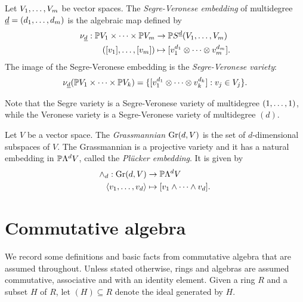 \begin{definition}
\label{introduction-definition-SegreVeronese}
Let $V_1 , \ldots , V_m$ be vector spaces. The \emph{Segre-Veronese embedding} of multidegree $\underline{d} = (d_1 , \ldots , d_m)$ is the algebraic map defined by 
\begin{align*}
\nu_{\underline{d}} : \mathbb{P} V_1 \times \cdots \times \mathbb{P} V_m &\to \mathbb{P} S^{\underline{d}}(V_1,\ldots,V_m) \\
([v_1] , \ldots , [v_m]) &\mapsto [v_1^{ d_1} \otimes \cdots \otimes v_m^{ d_m}].
\end{align*}
The image of the Segre-Veronese embedding is the \emph{Segre-Veronese variety}:
\[
\nu_{\underline{d}}( \mathbb{P} V_1 \times \cdots \times \mathbb{P} V_k ) = \{ [v_1^{ d_1} \otimes \cdots \otimes v_k^{ d_k}] :  v_j \in V_j\}.
\]
\end{definition}
Note that the Segre variety is a Segre-Veronese variety of multidegree $(1 , \ldots , 1)$, while the Veronese variety is a Segre-Veronese variety of multidegree $(d)$.

\begin{definition}[Grassmannian]
\label{introduction-definition-Grassmannian}
    Let $V$ be a vector space. The \emph{Grassmannian} $\mathrm{Gr}(d,V)$ is the set of $d$-dimensional subspaces of $V$. The Grassmannian is a projective variety and it has a natural embedding in $\mathbb{P} \Lambda^d V$, called the \emph{Pl\"ucker embedding}. It is given by
    \begin{align*}
    \wedge_{d} : \mathrm{Gr}(d,V) &\to \mathbb{P} \Lambda^{d}V \\
    \langle v_1 , \ldots , v_d \rangle &\mapsto [v_1 \wedge \dots \wedge v_d].
    \end{align*}
\end{definition}    


\section{Commutative algebra}
\label{introduction-section-commutativealgebra}
We record some definitions and basic facts from commutative algebra that are assumed throughout. Unless stated otherwise, rings and algebras are assumed commutative, associative and with an identity element. Given a ring $R$ and a subset $H$ of $R$, let $(H) \subseteq R$ denote the ideal generated by $H$.

